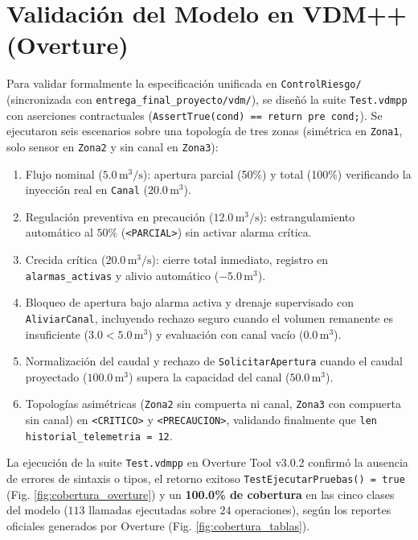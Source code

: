 \documentclass[conference]{IEEEtran}
\begin{document}
\section{Validación del Modelo en VDM++ (Overture)}
Para validar formalmente la especificación unificada en \texttt{ControlRiesgo/} (sincronizada con \texttt{entrega\_final\_proyecto/vdm/}), se diseñó la suite \texttt{Test.vdmpp} con aserciones contractuales (\texttt{AssertTrue(cond) == return pre cond;}). Se ejecutaron seis escenarios sobre una topología de tres zonas (simétrica en \texttt{Zona1}, solo sensor en \texttt{Zona2} y sin canal en \texttt{Zona3}):
\begin{enumerate}
    \item Flujo nominal ($5.0\,\text{m}^3/\text{s}$): apertura parcial (50\%) y total (100\%) verificando la inyección real en \texttt{Canal} ($20.0\,\text{m}^3$).
    \item Regulación preventiva en precaución ($12.0\,\text{m}^3/\text{s}$): estrangulamiento automático al $50\%$ (\texttt{<PARCIAL>}) sin activar alarma crítica.
    \item Crecida crítica ($20.0\,\text{m}^3/\text{s}$): cierre total inmediato, registro en \texttt{alarmas\_activas} y alivio automático ($-5.0\,\text{m}^3$).
    \item Bloqueo de apertura bajo alarma activa y drenaje supervisado con \texttt{AliviarCanal}, incluyendo rechazo seguro cuando el volumen remanente es insuficiente ($3.0 < 5.0\,\text{m}^3$) y evaluación con canal vacío ($0.0\,\text{m}^3$).
    \item Normalización del caudal y rechazo de \texttt{SolicitarApertura} cuando el caudal proyectado ($100.0\,\text{m}^3$) supera la capacidad del canal ($50.0\,\text{m}^3$).
    \item Topologías asimétricas (\texttt{Zona2} sin compuerta ni canal, \texttt{Zona3} con compuerta sin canal) en \texttt{<CRITICO>} y \texttt{<PRECAUCION>}, validando finalmente que \texttt{len historial\_telemetria = 12}.
\end{enumerate}

La ejecución de la suite \texttt{Test.vdmpp} en Overture Tool v3.0.2 confirmó la ausencia de errores de sintaxis o tipos, el retorno exitoso \texttt{Test\textasciigrave{}EjecutarPruebas() = true} (Fig. \ref{fig:cobertura_overture}) y un \textbf{100.0\% de cobertura} en las cinco clases del modelo ($113$ llamadas ejecutadas sobre $24$ operaciones), según los reportes oficiales generados por Overture (Fig. \ref{fig:cobertura_tablas}).
\end{document}
